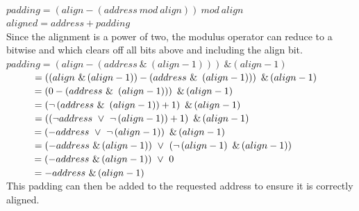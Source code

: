 \documentclass{article}
\begin{document}
\\
$padding = \left(align - \left(address\ mod\ align\right)\right)\ mod\ align$\\
$aligned = address + padding$\\
\pagebreak
Since the alignment is a power of two, the modulus operator can reduce to a bitwise and which clears off all bits above and including the align bit.\\
$padding = \left(align - \left(address\ \&\ \left(align - 1\right)\right)\right)\ \&\left(align - 1\right)$\\
$\hspace*{1cm} = \left(\left(align\ \& \left(align - 1\right)\right) - \left(address\ \&\ \left(align - 1\right)\right)\right)\ \&\left(align - 1\right)$\\
$\hspace*{1cm} = \left(0 - \left(address\ \&\ \left(align - 1\right)\right)\right)\ \&\left(align - 1\right)$\\
$\hspace*{1cm} = \left(\neg\left(address\ \&\ \left(align - 1\right)\right) + 1\right)\ \&\left(align - 1\right)$\\
$\hspace*{1cm} = \left(\left(\neg address\ \lor\ \neg\left(align - 1\right)\right) + 1\right)\ \&\left(align - 1\right)$\\
$\hspace*{1cm} = \left(-address\ \lor\ \neg\left(align - 1\right)\right)\ \&\left(align - 1\right)$\\
$\hspace*{1cm} = \left(-address\ \&\left(align - 1\right)\right)\ \lor\ \left(\neg\left(align - 1\right)\ \&\left(align - 1\right)\right)$\\
$\hspace*{1cm} = \left(-address\ \&\left(align - 1\right)\right)\ \lor\ 0$\\
$\hspace*{1cm} = -address\ \&\left(align - 1\right)$\\
This padding can then be added to the requested address to ensure it is correctly aligned.
\end{document}
